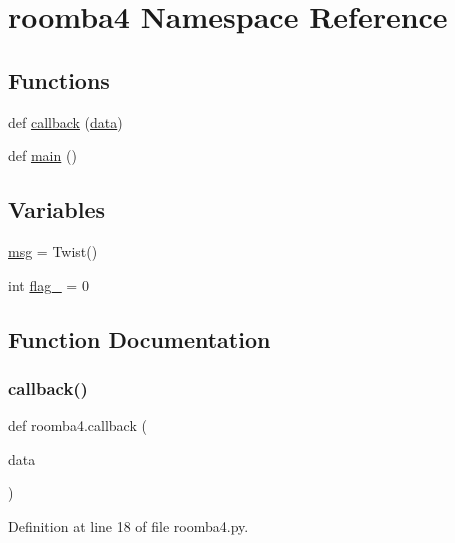 \hypertarget{namespaceroomba4}{}\section{roomba4 Namespace Reference}
\label{namespaceroomba4}
\subsection*{Functions}
\begin{DoxyCompactItemize}
\item 
def \mbox{\hyperlink{namespaceroomba4_a3c43485e950731723a9a8c4e4a8e88cc}{callback}} (\mbox{\hyperlink{structdata}{data}})
\item 
def \mbox{\hyperlink{namespaceroomba4_a3297f31194268a7cc6b7f66b107cc9e5}{main}} ()
\end{DoxyCompactItemize}
\subsection*{Variables}
\begin{DoxyCompactItemize}
\item 
\mbox{\hyperlink{namespaceroomba4_a57ff4960b95c34c06c1363c203bcbb4b}{msg}} = Twist()
\item 
int \mbox{\hyperlink{namespaceroomba4_a248d08a914d5acc819e11595fb012a55}{flag\+\_}} = 0
\end{DoxyCompactItemize}


\subsection{Function Documentation}
\mbox{\label{namespaceroomba4_a3c43485e950731723a9a8c4e4a8e88cc}} 
\subsubsection{\texorpdfstring{callback()}{callback()}}
{\footnotesize\ttfamily def roomba4.\+callback (\begin{DoxyParamCaption}\item[{}]{data }\end{DoxyParamCaption})}



Definition at line 18 of file roomba4.\+py.

\mbox{\label{namespaceroomba4_a3297f31194268a7cc6b7f66b107cc9e5}} 
